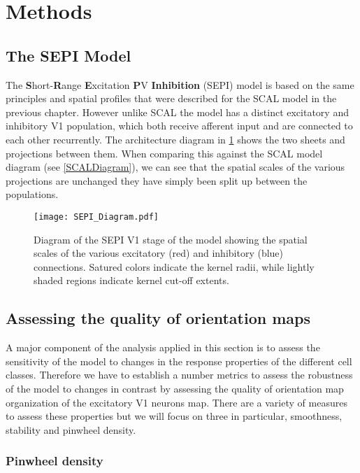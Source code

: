 \section{Methods}

\subsection{The SEPI Model}

The \textbf{S}hort-\textbf{R}ange \textbf{E}xcitation \textbf{P}V
\textbf{Inhibition} (SEPI) model is based on the same principles and
spatial profiles that were described for the SCAL model in the
previous chapter. However unlike SCAL the model has a distinct
excitatory and inhibitory V1 population, which both receive afferent
input and are connected to each other recurrently. The architecture
diagram in \ref{SEPIDiagram} shows the two sheets and projections
between them. When comparing this against the SCAL model diagram (see
\ref{SCALDiagram}), we can see that the spatial scales of the various
projections are unchanged they have simply been split up between the
populations.

\begin{figure}
	\centering
        \texttt{[image: SEPI\_Diagram.pdf]}
	\caption{Diagram of the SEPI V1 stage of the model showing the
          spatial scales of the various excitatory (red) and
          inhibitory (blue) connections. Satured colors indicate the
          kernel radii, while lightly shaded regions indicate kernel
          cut-off extents.}
	\label{SEPIDiagram}
\end{figure}

\subsection{Assessing the quality of orientation maps} \label{metrics}

A major component of the analysis applied in this section is to assess
the sensitivity of the model to changes in the response properties of
the different cell classes. Therefore we have to establish a number
metrics to assess the robustness of the model to changes in contrast
by assessing the quality of orientation map organization of the
excitatory V1 neurons map. There are a variety of measures to assess
these properties but we will focus on three in particular, smoothness,
stability and pinwheel density.

\subsubsection{Pinwheel density}

